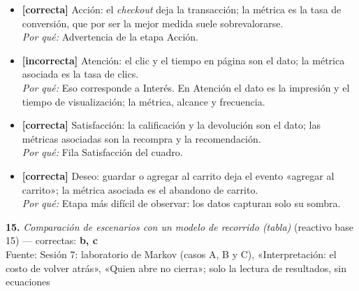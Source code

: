 \documentclass[10pt,letterpaper]{article}
\begin{document}
\begin{itemize}[leftmargin=1.2em,itemsep=0pt,topsep=1pt,parsep=0pt]
\item[\textbf{a)}] {\footnotesize \textbf{[correcta]} Acción: el \textit{checkout} deja la transacción; la métrica es la tasa de conversión, que por ser la mejor medida suele sobrevalorarse.\\ \textit{Por qué:} Advertencia de la etapa Acción.}
\item[\textbf{b)}] {\footnotesize \textbf{[incorrecta]} Atención: el clic y el tiempo en página son el dato; la métrica asociada es la tasa de clics.\\ \textit{Por qué:} Eso corresponde a Interés. En Atención el dato es la impresión y el tiempo de visualización; la métrica, alcance y frecuencia.}
\item[\textbf{c)}] {\footnotesize \textbf{[correcta]} Satisfacción: la calificación y la devolución son el dato; las métricas asociadas son la recompra y la recomendación.\\ \textit{Por qué:} Fila Satisfacción del cuadro.}
\item[\textbf{d)}] {\footnotesize \textbf{[correcta]} Deseo: guardar o agregar al carrito deja el evento «agregar al carrito»; la métrica asociada es el abandono de carrito.\\ \textit{Por qué:} Etapa más difícil de observar: los datos capturan solo su sombra.}
\end{itemize}
\vspace{3pt}\noindent\textbf{15.} \textit{Comparación de escenarios con un modelo de recorrido (tabla)} (reactivo base 15) — correctas: \textbf{b, c}\\[-1pt]
{\scriptsize Fuente: Sesión 7: laboratorio de Markov (casos A, B y C), «Interpretación: el costo de volver atrás», «Quien abre no cierra»; solo la lectura de resultados, sin ecuaciones}
\end{document}
